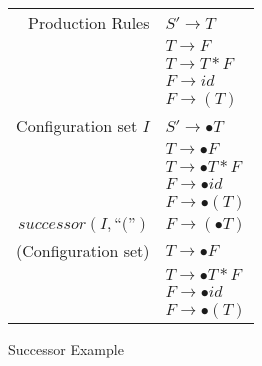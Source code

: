 \begin{figure}[!htb]
	\caption{Successor Example}
	\label{tab:successor-example}
	\begin{center}
		\begin{tabular}{ r | l }
			Production Rules
			& $S' \rightarrow T$ \\
			& $T \rightarrow F$ \\
			& $T \rightarrow T*F$ \\
			& $F \rightarrow id$ \\
			& $F \rightarrow (T)$ \\
			\hline
			Configuration set $I$
			& $S'\rightarrow \bullet T$ \\
			& $T \rightarrow \bullet F$ \\
			& $T \rightarrow \bullet T * F$ \\
			& $F \rightarrow \bullet id$ \\
			& $F \rightarrow \bullet (T)$ \\
			\hline
			\hline
			$successor(I, \textrm{``(''})$
			& $F \rightarrow (\bullet T)$ \\
			(Configuration set)
			& $T \rightarrow \bullet F$ \\
			& $T \rightarrow \bullet T * F$ \\
			& $F \rightarrow \bullet id$ \\
			& $F \rightarrow \bullet (T)$
		\end{tabular}
	\end{center}
\end{figure}

